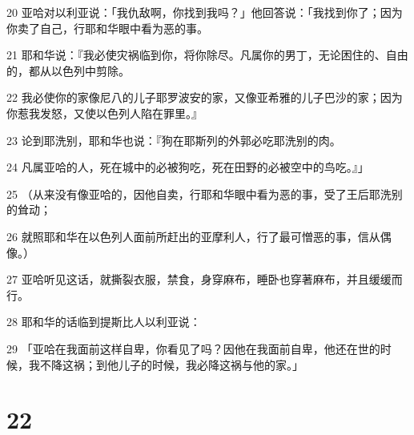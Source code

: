 \par 20 亚哈对以利亚说：「我仇敌啊，你找到我吗？」他回答说：「我找到你了；因为你卖了自己，行耶和华眼中看为恶的事。
\par 21 耶和华说：『我必使灾祸临到你，将你除尽。凡属你的男丁，无论困住的、自由的，都从以色列中剪除。
\par 22 我必使你的家像尼八的儿子耶罗波安的家，又像亚希雅的儿子巴沙的家；因为你惹我发怒，又使以色列人陷在罪里。』
\par 23 论到耶洗别，耶和华也说：『狗在耶斯列的外郭必吃耶洗别的肉。
\par 24 凡属亚哈的人，死在城中的必被狗吃，死在田野的必被空中的鸟吃。』」
\par 25 （从来没有像亚哈的，因他自卖，行耶和华眼中看为恶的事，受了王后耶洗别的耸动；
\par 26 就照耶和华在以色列人面前所赶出的亚摩利人，行了最可憎恶的事，信从偶像。）
\par 27 亚哈听见这话，就撕裂衣服，禁食，身穿麻布，睡卧也穿著麻布，并且缓缓而行。
\par 28 耶和华的话临到提斯比人以利亚说：
\par 29 「亚哈在我面前这样自卑，你看见了吗？因他在我面前自卑，他还在世的时候，我不降这祸；到他儿子的时候，我必降这祸与他的家。」

\chapter{22}

